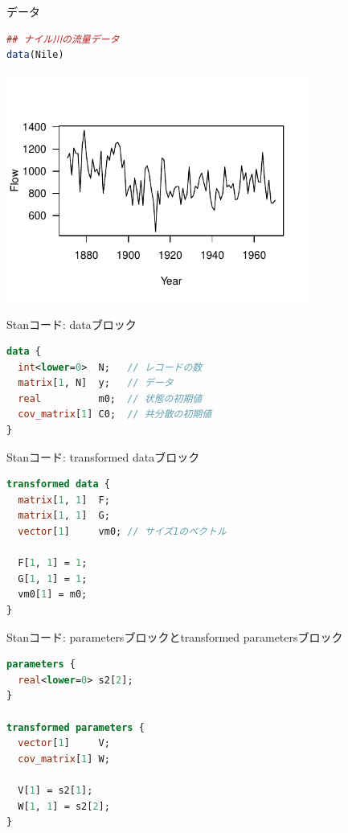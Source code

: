 \documentclass[dvipdfmx,12pt]{beamer}
\begin{document}
\begin{frame}[fragile]{データ}

\begin{lstlisting}[language=R]
## ナイル川の流量データ
data(Nile)
\end{lstlisting}

\begin{center}
\includegraphics[width=10cm]{Nile}
\end{center}
\end{frame}

\begin{frame}[fragile]{Stanコード: dataブロック}

\begin{lstlisting}[language=Stan]
data {
  int<lower=0>  N;   // レコードの数
  matrix[1, N]  y;   // データ
  real          m0;  // 状態の初期値
  cov_matrix[1] C0;  // 共分散の初期値
}
\end{lstlisting}
\end{frame}

\begin{frame}[fragile]{Stanコード: transformed dataブロック}

\begin{lstlisting}[language=Stan]
transformed data {
  matrix[1, 1]  F;
  matrix[1, 1]  G;
  vector[1]     vm0; // サイズ1のベクトル

  F[1, 1] = 1;
  G[1, 1] = 1;
  vm0[1] = m0;
}
\end{lstlisting}
\end{frame}

\begin{frame}[fragile]{Stanコード: parametersブロックとtransformed parametersブロック}

\begin{lstlisting}[language=Stan]
parameters {
  real<lower=0> s2[2];
}

transformed parameters {
  vector[1]     V;
  cov_matrix[1] W;

  V[1] = s2[1];
  W[1, 1] = s2[2];
}
\end{lstlisting}
\end{frame}
\end{document}
